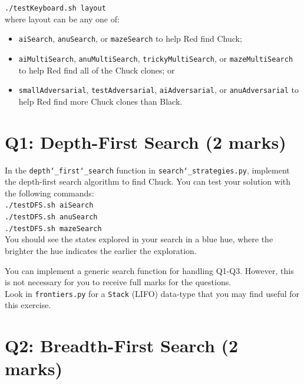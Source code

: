 \documentclass[12pt]{article}
\begin{document}
\texttt{./testKeyboard.sh layout}\\

where layout can be any one of:
\begin{itemize}
\item \texttt{aiSearch}, \texttt{anuSearch}, or \texttt{mazeSearch} to help Red find Chuck;
\item  \texttt{aiMultiSearch}, \texttt{anuMultiSearch}, \texttt{trickyMultiSearch}, or
\texttt{mazeMultiSearch} to help Red find all of the Chuck clones; or
\item \texttt{smallAdversarial}, \texttt{testAdversarial}, \texttt{aiAdversarial}, or
    \texttt{anuAdversarial} to help Red find more Chuck clones than Black.
\end{itemize}


\section{Q1: Depth-First Search (2 marks)}

In the \texttt{depth\char`_first\char`_search} function in \texttt{search\char`_strategies.py},
implement the depth-first search algorithm to find Chuck.
You can test your solution with the following commands:\\

\texttt{./testDFS.sh aiSearch}\\
\indent \texttt{./testDFS.sh anuSearch}\\
\indent \texttt{./testDFS.sh mazeSearch}\\

You should see the states explored in your search in a blue hue, 
where the brighter the hue indicates the earlier the exploration.

You can implement a generic search function for handling Q1-Q3. However,
this is not necessary for you to receive full marks for the questions.\\

Look in \texttt{frontiers.py} for a \texttt{Stack} (LIFO) data-type that you may find useful
for this exercise.

\section{Q2: Breadth-First Search (2 marks)}
\end{document}
